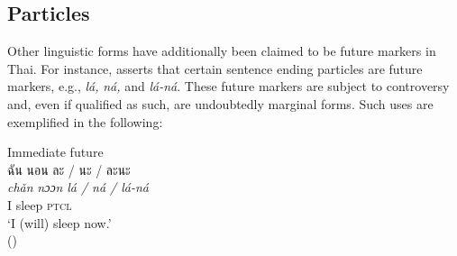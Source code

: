 \documentclass[output=paper,colorlinks,citecolor=brown]{langscibook}
\begin{document}
\subsection{Particles}\label{sec:khammee:2.4}

\largerpage[1]

Other linguistic forms have additionally been claimed to be future markers in Thai. For instance, \citet[]{Supanvanich1973} asserts that certain sentence ending particles are future markers, e.g., \textit{lá}\textit{, }\textit{ná}\textit{, }and \textit{lá-ná}. These future markers are subject to controversy and, even if qualified as such, are undoubtedly marginal forms. Such uses are exemplified in the following:


\ea \label{ex:11}
    Immediate future\\
    \textthai{ฉัน นอน ละ} / \textthai{นะ} / \textthai{ละนะ}\\
    \gll \textit{chǎn} \textit{nɔɔn} \textit{lá / ná / lá-ná}\\
    I sleep \textsc{ptcl}\\
    \glt ‘I (will) sleep now.’ \\
    \hfill (\cite{Supanvanich1973})
\z
\end{document}
